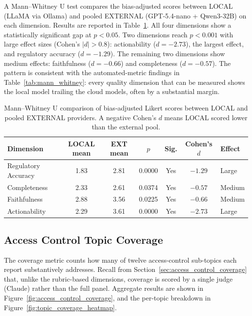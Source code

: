 \documentclass[]{UCD_CS_FYP_Report}
\begin{document}
A Mann--Whitney U test compares the bias-adjusted scores between LOCAL (LLaMA via Ollama) and pooled EXTERNAL (GPT-5.4-nano + Qwen3-32B) on each dimension. Results are reported in Table~\ref{tab:judge_mann_whitney}. All four dimensions show a statistically significant gap at $p < 0.05$. Two dimensions reach $p < 0.001$ with large effect sizes (Cohen's $|d| > 0.8$): actionability ($d = -2.73$), the largest effect, and regulatory accuracy ($d = -1.29$). The remaining two dimensions show medium effects: faithfulness ($d = -0.66$) and completeness ($d = -0.57$). The pattern is consistent with the automated-metric findings in Table~\ref{tab:mann_whitney}: every quality dimension that can be measured shows the local model trailing the cloud models, often by a substantial margin.

\begin{table}[!ht]
    \centering
    {\footnotesize
    \begin{tabular}{|l|c|c|c|c|c|l|}
    \hline
    \textbf{Dimension} & \textbf{LOCAL mean} & \textbf{EXT mean} & \textbf{$p$} & \textbf{Sig.} & \textbf{Cohen's $d$} & \textbf{Effect} \\ \hline
    Regulatory Accuracy & 1.83 & 2.81 & 0.0000 & Yes & $-1.29$ & Large  \\ \hline
    Completeness        & 2.33 & 2.61 & 0.0374 & Yes & $-0.57$ & Medium \\ \hline
    Faithfulness        & 2.88 & 3.56 & 0.0225 & Yes & $-0.66$ & Medium \\ \hline
    Actionability       & 2.29 & 3.61 & 0.0000 & Yes & $-2.73$ & Large  \\ \hline
    \end{tabular}
    }
    \caption{Mann--Whitney U comparison of bias-adjusted Likert scores between LOCAL and pooled EXTERNAL providers. A negative Cohen's $d$ means LOCAL scored lower than the external pool.}
    \label{tab:judge_mann_whitney}
\end{table}

\subsection{Access Control Topic Coverage}
\label{sec:judge_topic_coverage}

The coverage metric counts how many of twelve access-control sub-topics each report substantively addresses. Recall from Section~\ref{sec:access_control_coverage} that, unlike the rubric-based dimensions, coverage is scored by a single judge (Claude) rather than the full panel. Aggregate results are shown in Figure~\ref{fig:access_control_coverage}, and the per-topic breakdown in Figure~\ref{fig:topic_coverage_heatmap}.
\end{document}
